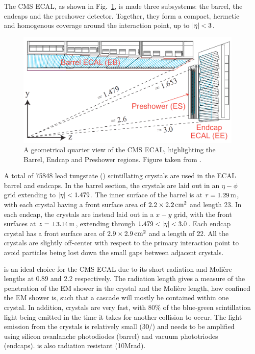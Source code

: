 The CMS ECAL, as shown in Fig.~\ref{fig:CMSECAL}, is made three subsystems: the barrel, the endcaps and the preshower detector.
Together, they form a compact, hermetic and homogenous coverage around the interaction point, up to $\lvert \eta \rvert<3$.
\begin{figure}[htpb]
	\centering
	\includegraphics[width=\textwidth]{Figures/CMSECAL2}
	\caption[A geometrical quarter view of the CMS ECAL, highlighting the Barrel, Endcap and Preshower regions.]{A geometrical quarter view of the CMS ECAL, highlighting the Barrel, Endcap and Preshower regions. Figure taken from \cite{CMSTDRV1}.}
	\label{fig:CMSECAL}
\end{figure}
A total of 75848 lead tungstate (\PbWO{}) scintillating crystals are used in the ECAL barrel and endcaps.
In the barrel section, the crystals are laid out in an $\eta-\phi$ grid extending to $\lvert \eta \rvert<1.479$.
The inner surface of the barrel is at $r=1.29\,\text{m}$, with each crystal having a front surface area of $2.2\times2.2\,\text{cm}^2$ and length 23\cm{}.
In each endcap, the crystals are instead laid out in a $x-y$ grid, with the front surfaces at $z=\pm 3.14\,\text{m}$, extending through $1.479 < \lvert \eta \rvert < 3.0$. 
Each endcap crystal has a front surface area of $2.9\times2.9\,\text{cm}^2$ and a length of 22\cm{}.
All the crystals are slightly off-center with respect to the primary interaction point to avoid particles being lost down the small gaps between adjacent crystals.

\PbWO{} is an ideal choice for the CMS ECAL due to its short radiation and Moli\`ere lengths at 0.89\cm{} and 2.2\cm{} respectively. 
The radiation length gives a measure of the penetration of the EM shower in the crystal and the Moli\`ere length, how confined the EM shower is, such that a cascade will mostly be contained within one crystal. 
In addition, \PbWO{} crystals are very fast, with 80\% of the blue-green scintillation light being emitted in the time it takes for another collision to occur.
The light emission from the \PbWO{} crystals is relatively small (30\photon{}/\MeV{}) and needs to be amplified using silicon avanlanche photodiodes (barrel) and vacuum phototriodes (endcaps).
\PbWO{} is also radiation resistant (10\unit{Mrad}).

